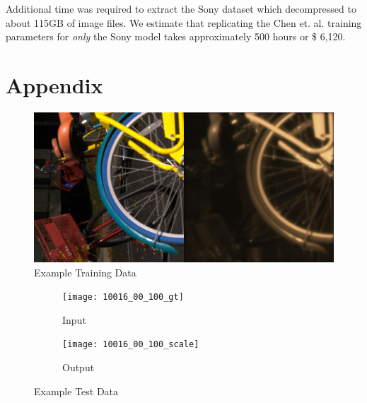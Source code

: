 \documentclass{article}
\begin{document}
Additional time was required to extract the Sony dataset
which decompressed to about 115GB of image files. We estimate that
replicating the Chen et. al. \cite{chen2018learning} training parameters
for \textit{only} the Sony model takes approximately 500 hours or
\$ 6,120.

\section{Appendix}

\begin{figure}[ht]
  \centering
  \includegraphics[scale=0.1]{00002_00_train_100}
  \caption{ Example Training Data}
  \label{fig:train}
\end{figure}

\begin{figure}[ht]
  \centering
  \begin{subfigure}[t]{0.3\textwidth}
    \texttt{[image: 10016\_00\_100\_gt]}
    \caption{Input}
  \end{subfigure}
  \begin{subfigure}[t]{0.3\textwidth}
    \texttt{[image: 10016\_00\_100\_scale]}
    \caption{Output}
  \end{subfigure}
  \caption{ Example Test Data}
  \label{fig:test}
\end{figure}




\end{document}
